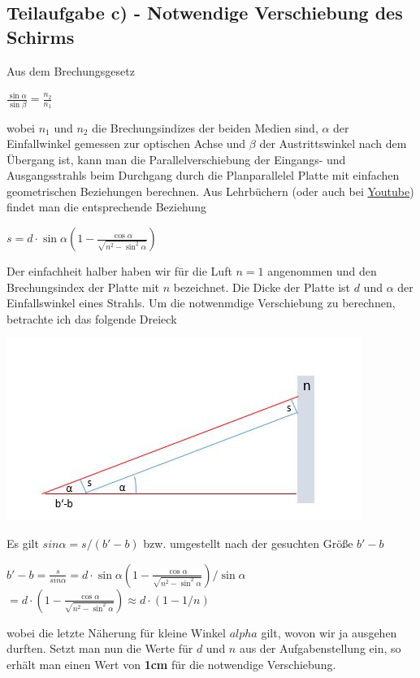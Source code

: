 \documentclass{article}
\begin{document}
\subsection*{Teilaufgabe c) - Notwendige Verschiebung des Schirms}
Aus dem Brechungsgesetz 
\begin{center}
	$\frac{\sin\alpha}{\sin\beta}=\frac{n_2}{n_1}$
\end{center}
wobei $n_1$ und $n_2$ die Brechungsindizes der beiden Medien sind, $\alpha$ der Einfallwinkel gemessen zur 
optischen Achse und $\beta$ der Austrittswinkel nach dem Übergang ist, 
kann man die Parallelverschiebung der Eingangs- und Ausgangsstrahls beim Durchgang durch die Planparallelel Platte mit einfachen geometrischen Beziehungen berechnen. 
Aus Lehrbüchern (oder auch bei \href{https://www.youtube.com/watch?v=j2ptt32nMWg}{Youtube}) findet man die entsprechende Beziehung
\begin{center}
	$s=d\cdot \sin\alpha \left( 1-\frac{\cos\alpha}{\sqrt{n^2-\sin^2\alpha}}\right)$
\end{center}
Der einfachheit halber haben wir für die Luft $n=1$ angenommen und den Brechungsindex der 
Platte mit $n$ bezeichnet. Die Dicke der Platte ist $d$ und $\alpha$ der Einfallswinkel eines Strahls. 
Um die notwenmdige Verschiebung zu berechnen, 
betrachte ich das folgende Dreieck
\begin{center}
	\includegraphics[scale=0.6]{Linse2.JPG}
\end{center}
Es gilt $sin\alpha=s/(b'-b)$ bzw. umgestellt nach der gesuchten Größe $b'-b$
\begin{center}
	$b'-b = \frac{s}{sin\alpha} = d\cdot \sin\alpha \left( 1-\frac{\cos\alpha}{\sqrt{n^2-\sin^2\alpha}}\right) / \sin\alpha $ \\
	$= d \cdot  \left( 1-\frac{\cos\alpha}{\sqrt{n^2-\sin^2\alpha}}\right) \approx d\cdot (1-1/n)$
\end{center}
wobei die letzte Näherung für kleine Winkel $alpha$ gilt, wovon wir ja ausgehen durften.
Setzt man nun die Werte für $d$ und $n$ aus der Aufgabenstellung ein, so erhält man einen Wert von \textbf{1cm} für die notwendige Verschiebung. 
\end{document}
